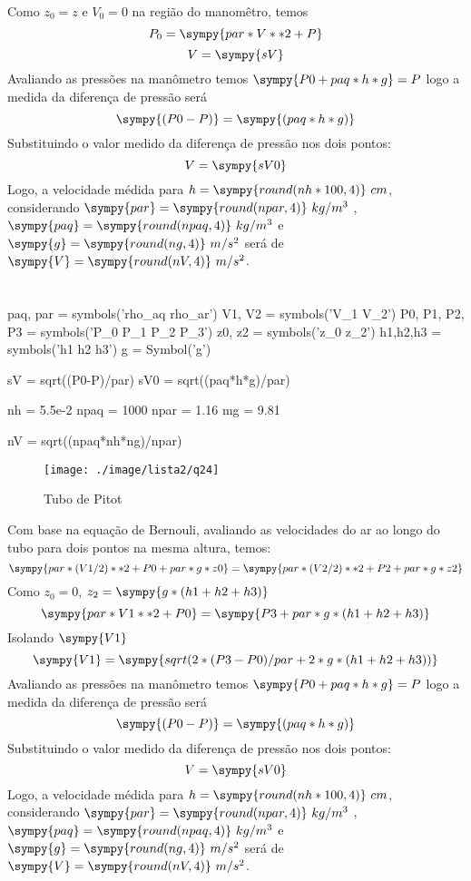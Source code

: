 \documentclass[a4paper,twocolumn,11pt]{article}
\newcommand{\npy}[1]{\sympy{round(n#1,4)}}
\newcommand{\nnpy}[1]{\sympy{#1} = \sympy{round(n#1,4)}}
\begin{document}
Como $z_0=z$ e $V_0=0$ na região do manomêtro, temos
$$
P_0 = \sympy{par*V**2 + P}
$$
\begin{equation}
V=\sympy{sV}
\end{equation}
Avaliando as pressões na manômetro temos $ \sympy{P0 + paq*h*g} = P$ logo a medida da diferença de pressão será
\begin{equation}
\sympy{(P0 - P)} = \sympy{(paq*h*g)}
\end{equation}
Substituindo o valor medido da diferença de pressão nos dois pontos:
\begin{equation}
V= \sympy{sV0}
\end{equation}
Logo, a velocidade médida para $h = \npy{h*100}\ cm$, considerando $\nnpy{par}\ kg/m^3$ , $\nnpy{paq}\ kg/m^3$ e $\nnpy{g}\ m/s^2$ será de $\nnpy{V}\ m/s^2$.

\section{} %
\begin{sympycode}
paq, par = symbols('rho_aq rho_ar')
V1, V2 = symbols('V_1 V_2')
P0, P1, P2, P3 = symbols('P_0 P_1 P_2 P_3')
z0, z2 = symbols('z_0 z_2')
h1,h2,h3 = symbols('h1 h2 h3')
g = Symbol('g')

sV = sqrt((P0-P)/par)
sV0 = sqrt((paq*h*g)/par)

nh = 5.5e-2
npaq = 1000
npar = 1.16
mg = 9.81

nV = sqrt((npaq*nh*ng)/npar)
\end{sympycode}

\begin{figure}[H]
\centering
\label{fig:l2q24}
\texttt{[image: ./image/lista2/q24]}
\caption{Tubo de Pitot}
\end{figure}
Com base na equação de Bernouli, avaliando as velocidades do ar ao longo do tubo para dois pontos na mesma altura, temos:
$$
\sympy{par*(V1/2)**2 +P0 + par*g*z0} = \sympy{par*(V2/2)**2 +P2 + par*g*z2}
$$
Como $z_0=0$, $z_2=\sympy{g*(h1+h2+h3)}$
$$
\sympy{par*V1**2 +P0} = \sympy{P3 + par*g*(h1+h2+h3)}
$$
Isolando $\sympy{V1}$
\begin{equation}
\sympy{V1} = \sympy{sqrt(2*(P3-P0)/par+2*g*(h1+h2+h3))}
\end{equation}
Avaliando as pressões na manômetro temos $ \sympy{P0 + paq*h*g} = P$ logo a medida da diferença de pressão será
\begin{equation}
\sympy{(P0 - P)} = \sympy{(paq*h*g)}
\end{equation}
Substituindo o valor medido da diferença de pressão nos dois pontos:
\begin{equation}
V= \sympy{sV0}
\end{equation}
Logo, a velocidade médida para $h = \npy{h*100}\ cm$, considerando $\nnpy{par}\ kg/m^3$ , $\nnpy{paq}\ kg/m^3$ e $\nnpy{g}\ m/s^2$ será de $\nnpy{V}\ m/s^2$.
\end{document}
